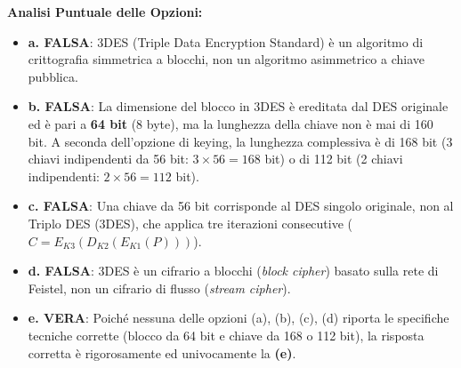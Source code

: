 \documentclass[11pt,a4paper]{article}
\begin{document}
\begin{solutionbox}
\textbf{Analisi Puntuale delle Opzioni:}
\begin{itemize}
    \item \textbf{a. FALSA}: 3DES (Triple Data Encryption Standard) \`e un algoritmo di crittografia simmetrica a blocchi, non un algoritmo asimmetrico a chiave pubblica.
    \item \textbf{b. FALSA}: La dimensione del blocco in 3DES \`e ereditata dal DES originale ed \`e pari a \textbf{64 bit} (8 byte), ma la lunghezza della chiave non \`e mai di 160 bit. A seconda dell'opzione di keying, la lunghezza complessiva \`e di 168 bit (3 chiavi indipendenti da 56 bit: $3 \times 56 = 168$ bit) o di 112 bit (2 chiavi indipendenti: $2 \times 56 = 112$ bit).
    \item \textbf{c. FALSA}: Una chiave da 56 bit corrisponde al DES singolo originale, non al Triplo DES (3DES), che applica tre iterazioni consecutive ($C = E_{K3}(D_{K2}(E_{K1}(P)))$).
    \item \textbf{d. FALSA}: 3DES \`e un cifrario a blocchi (\textit{block cipher}) basato sulla rete di Feistel, non un cifrario di flusso (\textit{stream cipher}).
    \item \textbf{e. VERA}: Poich\'e nessuna delle opzioni (a), (b), (c), (d) riporta le specifiche tecniche corrette (blocco da 64 bit e chiave da 168 o 112 bit), la risposta corretta \`e rigorosamente ed univocamente la \textbf{(e)}.
\end{itemize}
\end{solutionbox}
\end{document}
